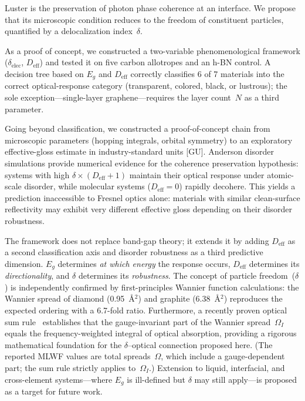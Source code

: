 \documentclass[twocolumn,showpacs,preprintnumbers,amsmath,amssymb,prb]{revtex4-2}
\begin{document}
Luster is the preservation of photon phase coherence at an interface.
We propose that its microscopic condition reduces to the freedom of
constituent particles, quantified by a delocalization index~$\delta$.

As a proof of concept, we constructed a two-variable phenomenological
framework ($\delta_\mathrm{elec}$, $D_\mathrm{eff}$) and tested it on
five carbon allotropes and an h-BN control. A decision tree based on
$E_g$ and $D_\mathrm{eff}$ correctly classifies 6 of 7 materials
into the correct optical-response category (transparent, colored,
black, or lustrous); the sole exception---single-layer graphene---requires
the layer count~$N$ as a third parameter.

Going beyond classification, we constructed a proof-of-concept chain
from microscopic parameters (hopping integrals, orbital symmetry)
to an exploratory effective-gloss estimate in industry-standard
units [GU]. Anderson disorder simulations provide numerical evidence
for the coherence preservation hypothesis: systems with high
$\delta \times (D_\mathrm{eff}+1)$ maintain their optical response
under atomic-scale disorder, while molecular systems
($D_\mathrm{eff} = 0$) rapidly decohere. This yields
a prediction inaccessible to Fresnel optics alone: materials with
similar clean-surface reflectivity may exhibit very different effective
gloss depending on their disorder robustness.

The framework does not replace band-gap theory; it extends it by
adding $D_\mathrm{eff}$ as a second classification axis and disorder
robustness as a third predictive dimension.
$E_g$ determines \emph{at which energy} the response occurs,
$D_\mathrm{eff}$ determines its \emph{directionality}, and
$\delta$ determines its \emph{robustness}. The concept of particle freedom~($\delta$) is independently confirmed
by first-principles Wannier function calculations: the Wannier spread
of diamond (0.95~\AA$^2$) and graphite (6.38~\AA$^2$) reproduces the
expected ordering with a 6.7-fold ratio. Furthermore, a recently
proven optical sum rule~\cite{CardenasCastillo2024} establishes that
the gauge-invariant part of the Wannier spread~$\Omega_I$ equals the
frequency-weighted integral of optical absorption, providing a rigorous
mathematical foundation for the $\delta$--optical connection proposed
here. (The reported MLWF values are total spreads~$\Omega$, which
include a gauge-dependent part; the sum rule strictly applies
to~$\Omega_I$.)
Extension to liquid, interfacial, and
cross-element systems---where $E_g$ is ill-defined but $\delta$ may
still apply---is proposed as a target for future work.
\end{document}
